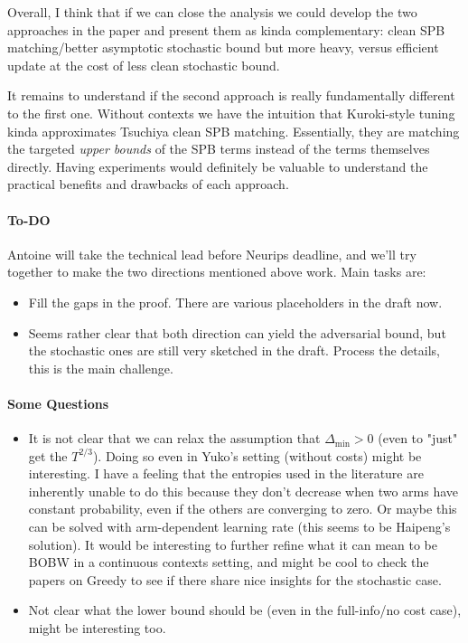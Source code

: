 \documentclass{article}
\theoremstyle{plain}
\theoremstyle{definition}
\theoremstyle{remark}
\begin{document}
Overall, I think that if we can close the analysis we could develop the two approaches in the paper and present them as kinda complementary: clean SPB matching/better asymptotic stochastic bound but more heavy, versus efficient update at the cost of less clean stochastic bound.

It remains to understand if the second approach is really fundamentally different to the first one. Without contexts we have the intuition that Kuroki-style tuning kinda approximates Tsuchiya clean SPB matching. Essentially, they are matching the targeted \textit{upper bounds} of the SPB terms instead of the terms themselves directly. Having experiments would definitely be valuable to understand the practical benefits and drawbacks of each approach. 

\paragraph{To-DO} Antoine will take the technical lead before Neurips deadline, and we'll try together to make the two directions mentioned above work. Main tasks are:
\begin{itemize}
	\item Fill the gaps in the proof. There are various placeholders in the draft now. 
	\item Seems rather clear that both direction can yield the adversarial bound, but the stochastic ones are still very sketched in the draft. Process the details, this is the main challenge.  	
\end{itemize}

\paragraph{Some Questions}
\begin{itemize}
	\item It is not clear that we can relax the assumption that $\Delta_{\min}>0$ (even to "just" get the $T^{2/3}$). Doing so even in Yuko's setting (without costs) might be interesting. I have a feeling that the entropies used in the literature are inherently unable to do this because they don't decrease when two arms have constant probability, even if the others are converging to zero. Or maybe this can be solved with arm-dependent learning rate (this seems to be Haipeng's solution). It would be interesting to further refine what it can mean to be BOBW in a continuous contexts setting, and might be cool to check the papers on Greedy to see if there share nice insights for the stochastic case.
	\item Not clear what the lower bound should be (even in the full-info/no cost case), might be interesting too. 
\end{itemize}
\end{document}
